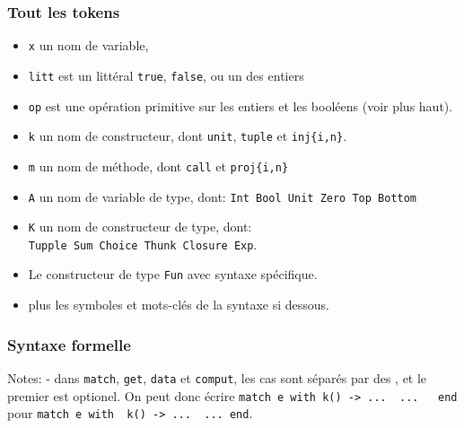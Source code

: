\documentclass[12pt]{article}
\begin{document}
\pagebreak

\hypertarget{tout-les-tokens}{%
      \subsubsection*{Tout les tokens}\label{tout-les-tokens}}

\begin{itemize}
      \tightlist
      \item
            \texttt{x} un nom de variable,
      \item
            \texttt{litt} est un littéral \texttt{true}, \texttt{false}, ou un des
            entiers
      \item
            \texttt{op} est une opération primitive sur les entiers et les
            booléens (voir plus haut).
      \item
            \texttt{k} un nom de constructeur, dont \texttt{unit}, \texttt{tuple}
            et \texttt{inj\{i,n\}}.
      \item
            \texttt{m} un nom de méthode, dont \texttt{call} et
            \texttt{proj\{i,n\}}
      \item
            \texttt{A} un nom de variable de type, dont:
            \texttt{Int\ Bool\ Unit\ Zero\ Top\ Bottom}
      \item
            \texttt{K} un nom de constructeur de type, dont:
            \texttt{Tupple\ Sum\ Choice\ Thunk\ Closure\ Exp}.
      \item
            Le constructeur de type \texttt{Fun} avec syntaxe spécifique.
      \item
            plus les symboles et mots-clés de la syntaxe si dessous.
\end{itemize}

\hypertarget{syntaxe-formelle}{%
      \subsubsection*{Syntaxe formelle}\label{syntaxe-formelle}}

Notes: - dans \texttt{match}, \texttt{get}, \texttt{data} et
\texttt{comput}, les cas sont séparés par des \texttt{\textbar{}}, et le
premier est optionel. On peut donc écrire
\texttt{match\ e\ with\ k()\ -\textgreater{}\ ...\ \textbar{}\ ...\ \ \ end}
pour
\texttt{match\ e\ with\ \textbar{}\ k()\ -\textgreater{}\ ...\ \textbar{}\ ...\ end}.
\end{document}
